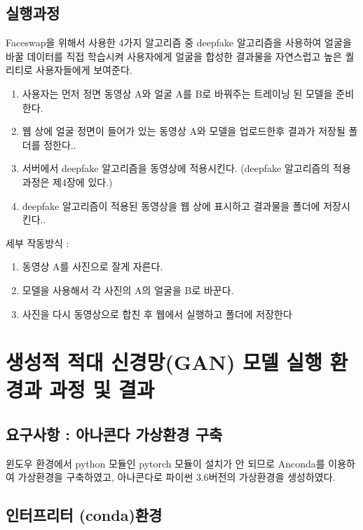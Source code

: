 \documentclass{oblivoir}
\begin{document}
\subsection{실행과정}

Faceswap을 위해서 사용한 4가지 알고리즘 중 deepfake 알고리즘을 사용하여 얼굴을 바꿀 데이터를 직접 학습시켜 사용자에게 얼굴을 합성한 결과물을 자연스럽고 높은 퀄리티로 사용자들에게 보여준다.
\begin{enumerate}
    \item  사용자는 먼저 정면 동영상 A와 얼굴 A를 B로 바꿔주는 트레이닝 된 모델을 준비한다.
    \item 웹 상에 얼굴 정면이 들어가 있는 동영상 A와 모델을 업로드한후 결과가 저장될 폴더를 정한다..
    \item 서버에서 deepfake 알고리즘을 동영상에 적용시킨다.  (deepfake 알고리즘의 적용과정은 제4장에 있다.)
    \item deepfake 알고리즘이 적용된 동영상을 웹 상에 표시하고 결과물을 폴더에 저장시킨다..
\end{enumerate}

세부 작동방식 :

\begin{enumerate}
    \item  동영상 A를 사진으로 잘게 자른다. 
    \item  모델을 사용해서 각 사진의 A의 얼굴을 B로 바꾼다. 
    \item  사진을 다시 동영상으로 합친 후 웹에서 실행하고 폴더에 저장한다
\end{enumerate}

\section{생성적 적대 신경망(GAN) 모델 실행 환경과 과정 및 결과}

\subsection{요구사항 : 아나콘다 가상환경 구축}


 윈도우 환경에서 python 모듈인 pytorch 모듈이 설치가 안 되므로 Anconda를 이용하여 가상환경을 구축하였고, 아나콘다로 파이썬 3.6버전의 가상환경을 생성하였다.
  
 \subsection{인터프리터 (conda)환경}
\end{document}
